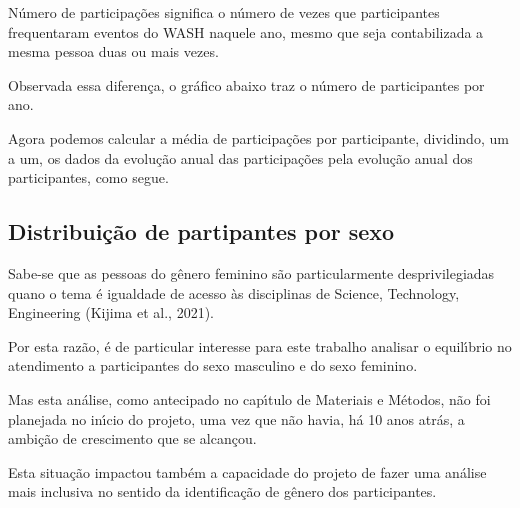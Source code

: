 \documentclass[
12pt,		%
openright,	%
twoside,  %
a4paper,			%
chapter=TITLE,		%
english,			%
french,				%
spanish,			%
brazil				%
]{USPSC-classe/USPSC_RedarTex}
\begin{document}
N\'umero de participa\c{c}\~oes significa o n\'umero de vezes que participantes frequentaram eventos do WASH naquele ano, mesmo que seja contabilizada a mesma pessoa duas ou mais vezes.








Observada essa diferen\c{c}a, o gr\'afico abaixo traz o n\'umero de participantes por ano.








Agora podemos calcular a m\'edia de participa\c{c}\~oes por participante, dividindo, um a um, os dados da evolu\c{c}\~ao anual das participa\c{c}\~oes pela evolu\c{c}\~ao anual dos participantes, como segue.








\subsection[Distribui\c{c}\~ao de partipantes por sexo]{Distribui\c{c}\~ao de partipantes por sexo}\label{Distribui\c{c}\~ao de partipantes por sexo}
Sabe-se que as pessoas do g\^enero feminino s\~ao particularmente desprivilegiadas quano o tema \'e igualdade de acesso \`as disciplinas de Science, Technology, Engineering  (Kijima et al., 2021).








Por esta raz\~ao, \'e de particular interesse para este trabalho analisar o equil\'{\i}brio no atendimento a participantes do sexo masculino e do sexo feminino.








Mas esta an\'alise, como antecipado no cap\'{\i}tulo de Materiais e M\'etodos, n\~ao foi planejada no in\'{\i}cio do projeto, uma vez que n\~ao havia, h\'a 10 anos atr\'as, a ambi\c{c}\~ao de crescimento que se alcan\c{c}ou.








Esta situa\c{c}\~ao impactou tamb\'em a capacidade do projeto de fazer uma an\'alise mais inclusiva no sentido da identifica\c{c}\~ao de g\^enero dos participantes.
\end{document}
